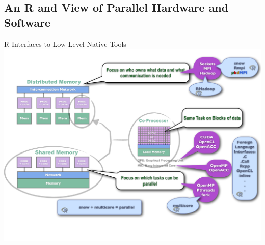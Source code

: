 \subsection{An R and \protect\pbdR View of Parallel Hardware and Software}

\begin{frame}{R Interfaces to Low-Level Native Tools}
\includegraphics[height=\textheight]
{../common/pics/hardware/ParallelHardware10.pdf}
\end{frame}

